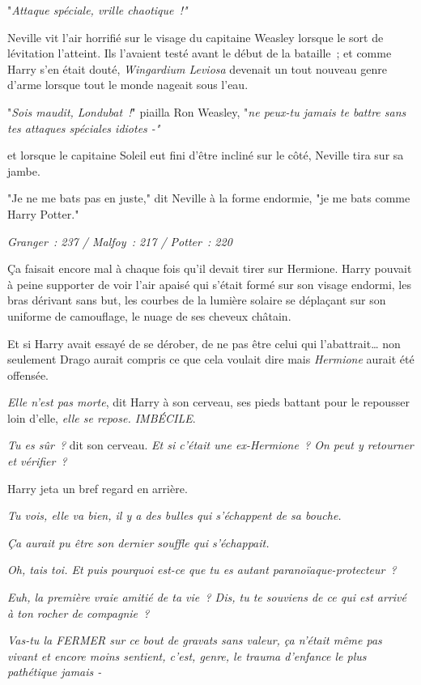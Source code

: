 "\emph{Attaque spéciale, vrille chaotique~!"}

Neville vit l'air horrifié sur le visage du capitaine Weasley lorsque le sort de lévitation l'atteint. Ils l'avaient testé avant le début de la bataille~; et comme Harry s'en était douté, \emph{Wingardium Leviosa} devenait un tout nouveau genre d'arme lorsque tout le monde nageait sous l'eau.

"\emph{Sois maudit, Londubat~!}" piailla Ron Weasley, "\emph{ne peux-tu jamais te battre sans tes attaques spéciales idiotes -"}

et lorsque le capitaine Soleil eut fini d'être incliné sur le côté, Neville tira sur sa jambe.

"Je ne me bats pas en juste," dit Neville à la forme endormie, "je me bats comme Harry Potter."

\emph{Granger~: 237 / Malfoy~: 217 / Potter~: 220}

\later

Ça faisait encore mal à chaque fois qu'il devait tirer sur Hermione. Harry pouvait à peine supporter de voir l'air apaisé qui s'était formé sur son visage endormi, les bras dérivant sans but, les courbes de la lumière solaire se déplaçant sur son uniforme de camouflage, le nuage de ses cheveux châtain.

Et si Harry avait essayé de se dérober, de ne pas être celui qui l'abattrait… non seulement Drago aurait compris ce que cela voulait dire mais \emph{Hermione} aurait été offensée.

\emph{Elle n'est pas morte}, dit Harry à son cerveau, ses pieds battant pour le repousser loin d'elle, \emph{elle se repose. IMBÉCILE}.

\emph{Tu es sûr~?} dit son cerveau. \emph{Et si c'était une ex-Hermione~? On peut y retourner et vérifier~?}

Harry jeta un bref regard en arrière.

\emph{Tu vois, elle va bien, il y a des bulles qui s'échappent de sa bouche.}

\emph{Ça aurait pu être son dernier souffle qui s'échappait.}

\emph{Oh, tais toi. Et puis pourquoi est-ce que tu es autant paranoïaque-protecteur~?}

\emph{Euh, la première vraie amitié de ta vie~? Dis, tu te souviens de ce qui est arrivé à ton rocher de compagnie~?}

\emph{Vas-tu la FERMER sur ce bout de gravats sans valeur, ça n'était même pas vivant et encore moins sentient, c'est, genre, le trauma d'enfance le plus pathétique jamais -}

